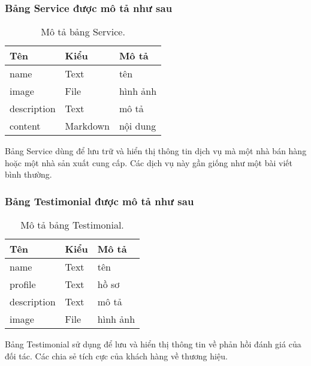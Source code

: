 \subsubsection{Bảng Service được mô tả như sau}
\begin{table}[!htbp]\fontsize{13px}{13px}\selectfont\justifying
\begin{center}
\caption{Mô tả bảng Service.}
\begin{tabularx}{0.6\textwidth}{ |l|l|X| } 
\hline
Tên & Kiểu & Mô tả \\
\hline
name & Text & tên \\
image & File & hình ảnh \\
description & Text & mô tả \\
content & Markdown & nội dung \\ 
\hline
\end{tabularx}
\label{table:Service}
\end{center}
Bảng Service dùng để lưu trữ và hiển thị thông tin dịch vụ mà một nhà bán hàng hoặc một nhà sản xuất cung cấp. Các dịch vụ này gần giống như một bài viết bình thường.
\end{table}
\clearpage
\subsubsection{Bảng Testimonial được mô tả như sau}
\begin{table}[!htbp]\fontsize{13px}{13px}\selectfont\justifying
\begin{center}
\caption{Mô tả bảng Testimonial.}
\begin{tabularx}{0.6\textwidth}{ |l|l|X| } 
\hline
Tên & Kiểu & Mô tả \\
\hline
name & Text & tên \\
profile & Text & hồ sơ \\
description & Text & mô tả \\
image & File & hình ảnh \\ 
\hline
\end{tabularx}
\label{table:Testimonial}
\end{center}
Bảng Testimonial sử dụng để lưu và hiển thị thông tin về phản hồi đánh giá của đối tác. Các chia sẻ tích cực của khách hàng về thương hiệu.
\end{table}
